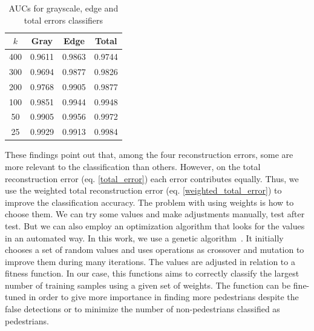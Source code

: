 \documentclass[10pt, conference, compsocconf]{IEEEtran}
\begin{document}
\begin{table}[t]
  \caption{AUCs for grayscale, edge and total errors classifiers}
  \begin{center}
    \begin{tabular}{  c | c  c  c  }
      \hline
      $k$ & Gray & Edge & Total \\
      \hline
      400 & 0.9611 & 0.9863 & 0.9744 \\
      300 & 0.9694 & 0.9877 & 0.9826 \\ 
      200 & 0.9768 & 0.9905 & 0.9877 \\
      100 & 0.9851 & 0.9944 & 0.9948 \\
      50  & 0.9905 & 0.9956 & 0.9972 \\
      25  & 0.9929 & 0.9913 & 0.9984 \\
      \hline  
    \end{tabular}
  \end{center}
  \label{table_gray_vs_edge}
\end{table}

These findings point out that, among the four reconstruction errors, some are more relevant to the classification than others. However, on the total reconstruction error (eq. \ref{total_error}) each error contributes equally. Thus, we use the weighted total reconstruction error (eq. \ref{weighted_total_error}) to improve the classification accuracy. The problem with using weights is how to choose them. We can try some values and make adjustments manually, test after test. But we can also employ an optimization algorithm that looks for the values in an automated way. In this work, we use a genetic algorithm~\cite{goldberg89}. It initially chooses a set of random values and uses operations as crossover and mutation to improve them during many iterations. The values are adjusted in relation to a fitness function. In our case, this functions aims to correctly classify the largest number of training samples using a given set of weights. The function can be fine-tuned in order to give more importance in finding more pedestrians despite the false detections or to minimize the number of non-pedestrians classified as pedestrians.
\end{document}
